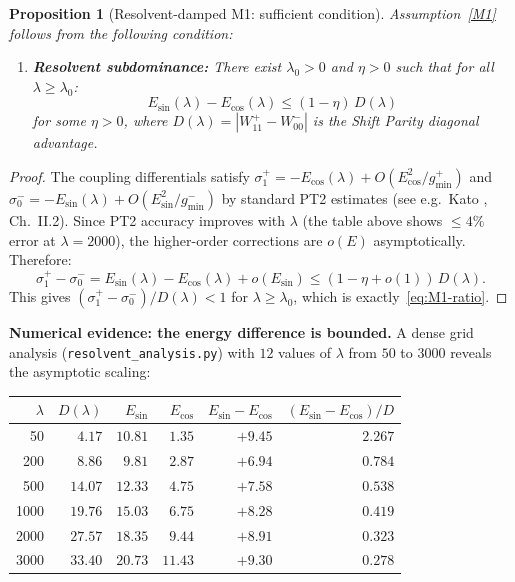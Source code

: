 \documentclass[12pt,a4paper]{article}
\newtheorem{proposition}[theorem]{Proposition}
\theoremstyle{definition}
\theoremstyle{remark}
\begin{document}
\begin{proposition}[Resolvent-damped M1: sufficient condition]
\label{prop:resolvent-M1}
Assumption~\ref{M1} follows from the following condition:
\begin{enumerate}[label=\textup{(M1$''$)}]
  \item\label{M1pp} \textbf{Resolvent subdominance:} There exist $\lambda_0 > 0$ and $\eta > 0$ such that for all $\lambda \geq \lambda_0$:
  \begin{equation}
  \label{eq:resolvent-subdominance}
    E_{\sin}(\lambda) - E_{\cos}(\lambda) \leq (1 - \eta)\,D(\lambda)
  \end{equation}
  for some $\eta > 0$, where $D(\lambda) = |W_{11}^+ - W_{00}^-|$ is the Shift Parity diagonal advantage.
\end{enumerate}
\end{proposition}

\begin{proof}
The coupling differentials satisfy $\sigma_1^+ = -E_{\cos}(\lambda) + O(E_{\cos}^2/g_{\min}^+)$ and $\sigma_0^- = -E_{\sin}(\lambda) + O(E_{\sin}^2/g_{\min}^-)$ by standard PT2 estimates (see e.g.\ Kato \cite{Kato1995}, Ch.~II.2). Since PT2 accuracy improves with $\lambda$ (the table above shows $\leq 4\%$ error at $\lambda = 2000$), the higher-order corrections are $o(E)$ asymptotically. Therefore:
\[
  \sigma_1^+ - \sigma_0^- = E_{\sin}(\lambda) - E_{\cos}(\lambda) + o(E_{\sin}) \leq (1 - \eta + o(1))\,D(\lambda).
\]
This gives $(\sigma_1^+ - \sigma_0^-)/D(\lambda) < 1$ for $\lambda \geq \lambda_0$, which is exactly~\eqref{eq:M1-ratio}.
\end{proof}

\noindent\textbf{Numerical evidence: the energy difference is bounded.} A dense grid analysis (\texttt{resolvent\_analysis.py}) with $12$ values of $\lambda$ from $50$ to $3000$ reveals the asymptotic scaling:

\begin{center}
\small
\renewcommand{\arraystretch}{1.15}
\begin{tabular}{r|r|r|r|r|r}
$\lambda$ & $D(\lambda)$ & $E_{\sin}$ & $E_{\cos}$ & $E_{\sin}\!-\!E_{\cos}$ & $(E_{\sin}\!-\!E_{\cos})/D$ \\\hline
50   & $4.17$  & $10.81$ & $1.35$ & $+9.45$ & $2.267$ \\
200  & $8.86$  & $9.81$  & $2.87$ & $+6.94$ & $0.784$ \\
500  & $14.07$ & $12.33$ & $4.75$ & $+7.58$ & $0.538$ \\
1000 & $19.76$ & $15.03$ & $6.75$ & $+8.28$ & $0.419$ \\
2000 & $27.57$ & $18.35$ & $9.44$ & $+8.91$ & $0.323$ \\
3000 & $33.40$ & $20.73$ & $11.43$ & $+9.30$ & $0.278$
\end{tabular}
\end{center}
\end{document}
